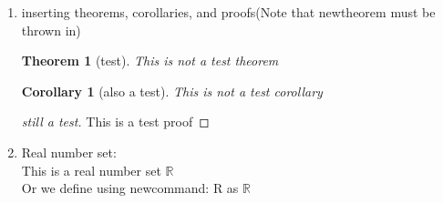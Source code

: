 \documentclass{article}
\newtheorem{theorem}{Theorem}[section]
\newtheorem{corollary}{Corollary}[theorem]
\newtheorem{proof}{Proof}[corollary]
\newcommand{\R}{\mathbb{R}}
\begin{document}
\begin{enumerate}
\item inserting theorems, corollaries, and proofs(Note that newtheorem must be thrown in)
\begin{theorem}[test]
This is not a test theorem
\end{theorem}

\begin{corollary}[also a test]
This is not a test corollary
\end{corollary}

\begin{proof}[still a  test]
This is a test proof
\end{proof}

\item Real number set:\\
This is a real number set $\mathbb{R}$\\
Or we define using newcommand: R as $\R$

\end{enumerate}
\end{document}
